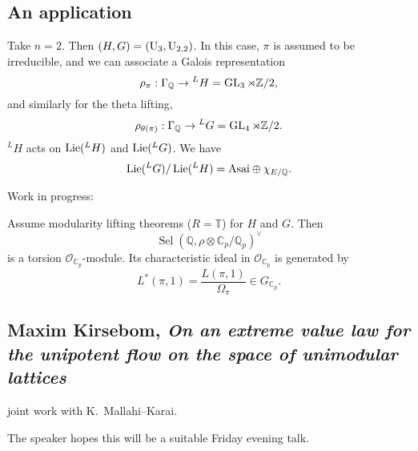 \documentclass[reqno]{amsart} 
\numberwithin{theorem}{section}
\numberwithin{equation}{section}
\begin{document}
\subsection{An application}

Take $n = 2$.  Then $(H, G) =(\operatorname{U}_3, \operatorname{U}_{2, 2})$.  In this case, $\pi$ is assumed to be irreducible, and we can associate a Galois representation
\begin{equation*}
  \rho_\pi : \Gamma_{\mathbb{Q}} \rightarrow {}^L H = \operatorname{GL}_3 \rtimes \mathbb{Z} /2,
\end{equation*}
and similarly for the theta lifting,
\begin{equation*}
  \rho_{\theta(\pi)} : \Gamma_{\mathbb{Q}} \rightarrow {}^L G = \operatorname{GL}_4 \rtimes \mathbb{Z} /2.
\end{equation*}
${}^L H$ acts on $\operatorname{Lie}({}^L H)$ and $\operatorname{Lie}({}^L G)$.  We have
\begin{equation*}
  \operatorname{Lie}({}^L G) / \operatorname{Lie}({}^L H) = \mathrm{Asai} \oplus \chi_{E/\mathbb{Q}}.
\end{equation*}

Work in progress:
\begin{theorem}[Z, '24]
  Assume modularity lifting theorems ($R = \mathbb{T}$) for $H$ and $G$.  Then
  \begin{equation*}
    \operatorname{Sel}(\mathbb{Q},
    \rho \otimes 
    \mathbb{C}_p / \mathbb{Q}_p
    )^\vee
  \end{equation*}
  is a torsion $\mathcal{O}_{\mathbb{C}_p}$-module.  Its characteristic ideal in $\mathcal{O}_{\mathbb{C}_p}$ is generated by
  \begin{equation*}
    L^\ast(\pi, 1)
    = \frac{L(\pi, 1)}{\Omega_\pi} \in G_{\mathbb{C}_p}.
  \end{equation*}
\end{theorem}


\subsection{Maxim Kirsebom, \emph{On an extreme value law for the unipotent flow on the space of unimodular lattices}}

joint work with K.\ Mallahi--Karai.  \cite{2022arXiv2209.07283}

The speaker hopes this will be a suitable Friday evening talk.
\end{document}
